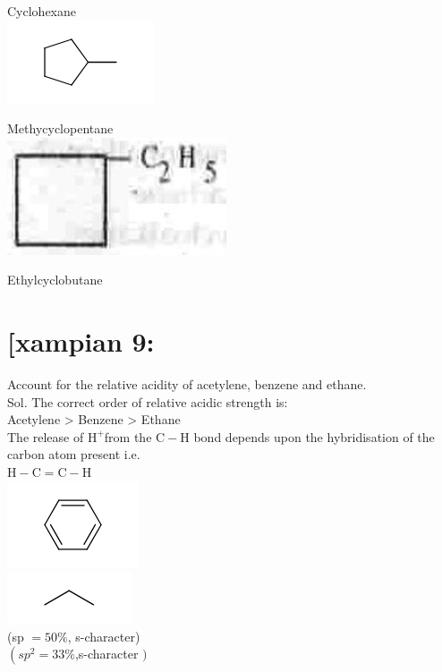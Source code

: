 \documentclass[10pt]{article}
\begin{document}
Cyclohexane\\
\includegraphics{smile-c4b1ec70a2999f61b66647573e446bb6445c5b44}

Methycyclopentane\\
\includegraphics[max width=\textwidth, center]{2025_01_28_8470952b98110cec3aabg-199}

Ethylcyclobutane

\section*{[xampian 9:}
Account for the relative acidity of acetylene, benzene and ethane.\\
Sol. The correct order of relative acidic strength is:\\
Acetylene > Benzene > Ethane\\
The release of $\mathrm{H}^{+}$from the $\mathrm{C}-\mathrm{H}$ bond depends upon the hybridisation of the carbon atom present i.e.\\
$\mathrm{H}-\mathrm{C}=\mathrm{C}-\mathrm{H}$\\
\includegraphics{smile-a62b008a596e2bb6cb155885f95016d22a23d82c}\\
\includegraphics{smile-89f2715bffdb02bdd93d8e2db845b072f518bb45}\\
(sp $=50 \%$, s-character)\\
$\left(s p^{2}=33 \%\right.$,s-character $)$
\end{document}
